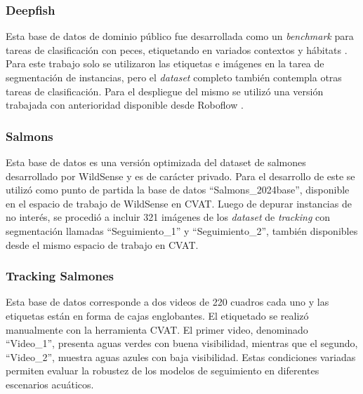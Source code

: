 \subsubsection{Deepfish}
Esta base de datos de dominio público fue desarrollada como un \textit{benchmark} para tareas de clasificación con peces, etiquetando en variados contextos y hábitats \cite{Deepfish}. Para este trabajo solo se utilizaron las etiquetas e imágenes en la tarea de segmentación de instancias, pero el \textit{dataset} completo también contempla otras tareas de clasificación. Para el despliegue del mismo se utilizó una versión trabajada con anterioridad disponible desde Roboflow \cite{DeepfishRoboflow}.

\subsubsection{Salmons}
Esta base de datos es una versión optimizada del dataset de salmones desarrollado por WildSense y es de carácter privado. Para el desarrollo de este se utilizó como punto de partida la base de datos ``Salmons_2024base'', disponible en el espacio de trabajo de WildSense en CVAT. Luego de depurar instancias de no interés, se procedió a incluir 321 imágenes de los \textit{dataset} de \textit{tracking} con segmentación llamadas ``Seguimiento_1'' y ``Seguimiento_2'', también disponibles desde el mismo espacio de trabajo en CVAT.

\subsubsection{Tracking Salmones}
Esta base de datos corresponde a dos videos de 220 cuadros cada uno y las etiquetas están en forma de cajas englobantes. El etiquetado se realizó manualmente con la herramienta CVAT. El primer video, denominado ``Video\_1'', presenta aguas verdes con buena visibilidad, mientras que el segundo, ``Video\_2'', muestra aguas azules con baja visibilidad. Estas condiciones variadas permiten evaluar la robustez de los modelos de seguimiento en diferentes escenarios acuáticos.
